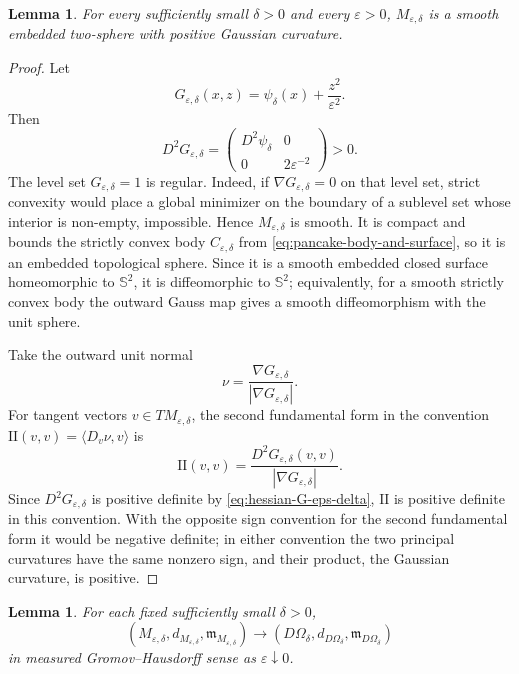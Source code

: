\documentclass[11pt]{amsart}
\newtheorem{lemma}[theorem]{Lemma}
\numberwithin{equation}{section}
\newcommand{\Om}{\Omega}
\newcommand{\eps}{\varepsilon}
\newcommand{\mm}{\mathfrak m}
\begin{document}
\begin{lemma}\label{lem:positive-curvature}
For every sufficiently small $\delta>0$ and every $\eps>0$,
$M_{\eps,\delta}$ is a smooth embedded two-sphere with positive Gaussian
curvature.
\end{lemma}

\begin{proof}
Let
$$
G_{\eps,\delta}(x,z)=\psi_\delta(x)+\frac{z^2}{\eps^2}.
$$
Then
\begin{equation}\label{eq:hessian-G-eps-delta}
D^2G_{\eps,\delta}=\begin{pmatrix}
D^2\psi_\delta&0\\[2mm]
0&2\eps^{-2}
\end{pmatrix}>0.
\end{equation}
The level set $G_{\eps,\delta}=1$ is regular.  Indeed, if
$\nabla G_{\eps,\delta}=0$ on that level set, strict convexity would place a
global minimizer on the boundary of a sublevel set whose interior is non-empty,
impossible.  Hence $M_{\eps,\delta}$ is smooth.  It is compact and bounds the
strictly convex body $C_{\eps,\delta}$ from \eqref{eq:pancake-body-and-surface},
so it is an embedded topological sphere.  Since it is a smooth embedded closed
surface homeomorphic to $\mathbb S^2$, it is diffeomorphic to $\mathbb S^2$; equivalently,
for a smooth strictly convex body the outward Gauss map gives a smooth
diffeomorphism with the unit sphere.

Take the outward unit normal
$$
\nu=\frac{\nabla G_{\eps,\delta}}{|\nabla G_{\eps,\delta}|}.
$$
For tangent vectors $v\in T M_{\eps,\delta}$, the second fundamental form in the
convention $\mathrm{II}(v,v)=\langle D_v\nu,v\rangle$ is
\begin{equation}\label{eq:second-fundamental-level-set}
\mathrm{II}(v,v)=\frac{D^2G_{\eps,\delta}(v,v)}{|\nabla G_{\eps,\delta}|}.
\end{equation}
Since $D^2G_{\eps,\delta}$ is positive definite by
\eqref{eq:hessian-G-eps-delta}, $\mathrm{II}$ is positive definite in this
convention.  With the opposite sign convention for the second fundamental form it
would be negative definite; in either convention the two principal curvatures
have the same nonzero sign, and their product, the Gaussian curvature, is
positive.
\end{proof}

\begin{lemma}\label{lem:pancake-convergence-fixed-delta}
For each fixed sufficiently small $\delta>0$,
\begin{equation}\label{eq:pancake-fixed-delta-convergence}
(M_{\eps,\delta},d_{M_{\eps,\delta}},\mm_{M_{\eps,\delta}})
\longrightarrow
(D\Om_\delta,d_{D\Om_\delta},\mm_{D\Om_\delta})
\end{equation}
in measured Gromov--Hausdorff sense as $\eps\downarrow0$.
\end{lemma}
\end{document}
